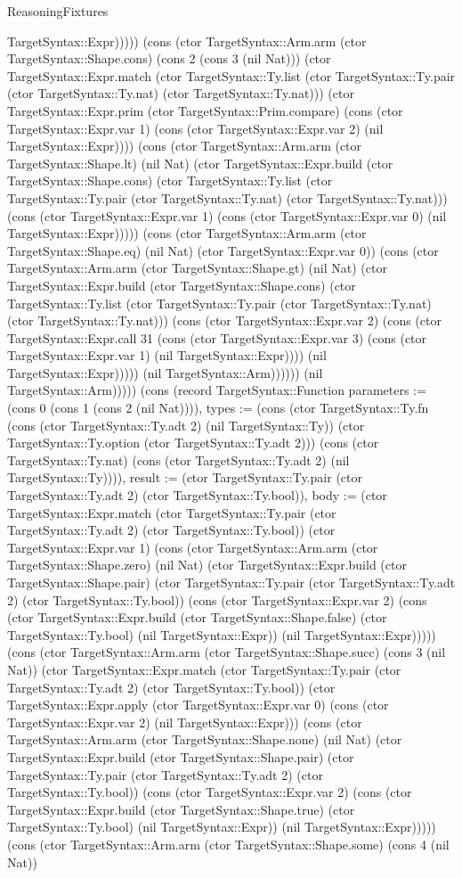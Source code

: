 \begin{lexlean}{ReasoningFixtures}
\begin{semanticmodule}
{TargetSyntax::Expr))))) (cons (ctor TargetSyntax::Arm.arm (ctor TargetSyntax::Shape.cons) (cons 2 (cons 3 (nil Nat))) (ctor TargetSyntax::Expr.match (ctor TargetSyntax::Ty.list (ctor TargetSyntax::Ty.pair (ctor TargetSyntax::Ty.nat) (ctor TargetSyntax::Ty.nat))) (ctor TargetSyntax::Expr.prim (ctor TargetSyntax::Prim.compare) (cons (ctor TargetSyntax::Expr.var 1) (cons (ctor TargetSyntax::Expr.var 2) (nil TargetSyntax::Expr)))) (cons (ctor TargetSyntax::Arm.arm (ctor TargetSyntax::Shape.lt) (nil Nat) (ctor TargetSyntax::Expr.build (ctor TargetSyntax::Shape.cons) (ctor TargetSyntax::Ty.list (ctor TargetSyntax::Ty.pair (ctor TargetSyntax::Ty.nat) (ctor TargetSyntax::Ty.nat))) (cons (ctor TargetSyntax::Expr.var 1) (cons (ctor TargetSyntax::Expr.var 0) (nil TargetSyntax::Expr))))) (cons (ctor TargetSyntax::Arm.arm (ctor TargetSyntax::Shape.eq) (nil Nat) (ctor TargetSyntax::Expr.var 0)) (cons (ctor TargetSyntax::Arm.arm (ctor TargetSyntax::Shape.gt) (nil Nat) (ctor TargetSyntax::Expr.build (ctor TargetSyntax::Shape.cons) (ctor TargetSyntax::Ty.list (ctor TargetSyntax::Ty.pair (ctor TargetSyntax::Ty.nat) (ctor TargetSyntax::Ty.nat))) (cons (ctor TargetSyntax::Expr.var 2) (cons (ctor TargetSyntax::Expr.call 31 (cons (ctor TargetSyntax::Expr.var 3) (cons (ctor TargetSyntax::Expr.var 1) (nil TargetSyntax::Expr)))) (nil TargetSyntax::Expr))))) (nil TargetSyntax::Arm)))))) (nil TargetSyntax::Arm))))}) (cons (record TargetSyntax::Function {parameters := (cons 0 (cons 1 (cons 2 (nil Nat)))), types := (cons (ctor TargetSyntax::Ty.fn (cons (ctor TargetSyntax::Ty.adt 2) (nil TargetSyntax::Ty)) (ctor TargetSyntax::Ty.option (ctor TargetSyntax::Ty.adt 2))) (cons (ctor TargetSyntax::Ty.nat) (cons (ctor TargetSyntax::Ty.adt 2) (nil TargetSyntax::Ty)))), result := (ctor TargetSyntax::Ty.pair (ctor TargetSyntax::Ty.adt 2) (ctor TargetSyntax::Ty.bool)), body := (ctor TargetSyntax::Expr.match (ctor TargetSyntax::Ty.pair (ctor TargetSyntax::Ty.adt 2) (ctor TargetSyntax::Ty.bool)) (ctor TargetSyntax::Expr.var 1) (cons (ctor TargetSyntax::Arm.arm (ctor TargetSyntax::Shape.zero) (nil Nat) (ctor TargetSyntax::Expr.build (ctor TargetSyntax::Shape.pair) (ctor TargetSyntax::Ty.pair (ctor TargetSyntax::Ty.adt 2) (ctor TargetSyntax::Ty.bool)) (cons (ctor TargetSyntax::Expr.var 2) (cons (ctor TargetSyntax::Expr.build (ctor TargetSyntax::Shape.false) (ctor TargetSyntax::Ty.bool) (nil TargetSyntax::Expr)) (nil TargetSyntax::Expr))))) (cons (ctor TargetSyntax::Arm.arm (ctor TargetSyntax::Shape.succ) (cons 3 (nil Nat)) (ctor TargetSyntax::Expr.match (ctor TargetSyntax::Ty.pair (ctor TargetSyntax::Ty.adt 2) (ctor TargetSyntax::Ty.bool)) (ctor TargetSyntax::Expr.apply (ctor TargetSyntax::Expr.var 0) (cons (ctor TargetSyntax::Expr.var 2) (nil TargetSyntax::Expr))) (cons (ctor TargetSyntax::Arm.arm (ctor TargetSyntax::Shape.none) (nil Nat) (ctor TargetSyntax::Expr.build (ctor TargetSyntax::Shape.pair) (ctor TargetSyntax::Ty.pair (ctor TargetSyntax::Ty.adt 2) (ctor TargetSyntax::Ty.bool)) (cons (ctor TargetSyntax::Expr.var 2) (cons (ctor TargetSyntax::Expr.build (ctor TargetSyntax::Shape.true) (ctor TargetSyntax::Ty.bool) (nil TargetSyntax::Expr)) (nil TargetSyntax::Expr))))) (cons (ctor TargetSyntax::Arm.arm (ctor TargetSyntax::Shape.some) (cons 4 (nil Nat)) }
\end{semanticmodule}
\end{lexlean}
